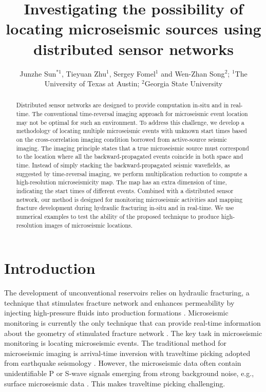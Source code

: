 
\title{Investigating the possibility of locating microseismic sources using distributed sensor networks}
\author{Junzhe Sun$^{*1}$, Tieyuan Zhu$^1$, Sergey Fomel$^1$ and Wen-Zhan Song$^{2}$; $^1$The University of Texas at Austin; $^2$Georgia State University}

\maketitle


\begin{abstract}
Distributed sensor networks are designed to provide computation in-situ and in real-time. The conventional time-reversal imaging approach for microseismic event location may not be optimal for such an environment. To address this challenge, we develop a methodology of locating multiple microseismic events with unknown start times based on the cross-correlation imaging condition borrowed from active-source seismic imaging. The imaging principle states that a true microseismic source must correspond to the location where all the backward-propagated events coincide in both space and time. Instead of simply stacking the backward-propagated seismic wavefields, as suggested by time-reversal imaging, we perform multiplication reduction to compute a high-resolution microseismicity map. The map has an extra dimension of time, indicating the start times of different events. Combined with a distributed sensor network, our method is designed for monitoring microseismic activities and mapping fracture development during hydraulic fracturing in-situ and in real-time. We use numerical examples to test the ability of the proposed technique to produce high-resolution images of microseismic locations.
\end{abstract}

\section{Introduction}
The development of unconventional reservoirs relies on hydraulic fracturing, a technique that stimulates fracture network and enhances permeability by injecting high-pressure fluids into production formations \cite[]{montgomery10}. Microseismic monitoring is currently the only technique that can provide real-time information about the geometry of stimulated fracture network \cite[]{maxwellbook}. The key task in microseismic monitoring is locating microseismic events. The traditional method for microseismic imaging is arrival-time inversion with traveltime picking adopted from earthquake seismology \cite[]{gibowicz13}. However, the microseismic data often contain unidentifiable P or S-wave signals emerging from strong background noise, e.g., surface microseismic data \cite[]{duncan10}. This makes traveltime picking challenging.

